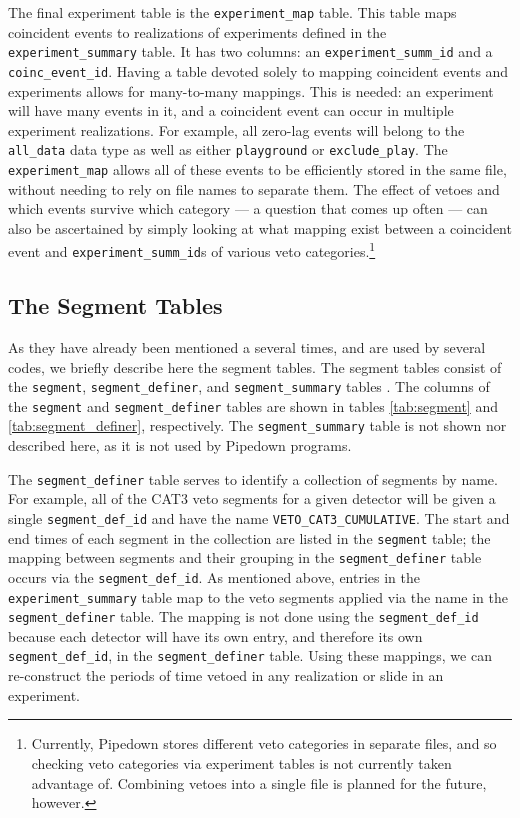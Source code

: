 The final experiment table is the \texttt{experiment\_map} table. This table maps coincident events to realizations of experiments defined in the \texttt{experiment\_summary} table. It has two columns: an \texttt{experiment\_summ\_id} and a \texttt{coinc\_event\_id}. Having a table devoted solely to mapping coincident events and experiments allows for many-to-many mappings. This is needed: an experiment will have many events in it, and a coincident event can occur in multiple experiment realizations. For example, all zero-lag events will belong to the \texttt{all\_data} data type as well as either \texttt{playground} or \texttt{exclude\_play}. The \texttt{experiment\_map} allows all of these events to be efficiently stored in the same file, without needing to rely on file names to separate them. The effect of vetoes and which events survive which category --- a question that comes up often --- can also be ascertained by simply looking at what mapping exist between a coincident event and \texttt{experiment\_summ\_id}s of various veto categories.\footnote{Currently, Pipedown stores different veto categories in separate files, and so checking veto categories via experiment tables is not currently taken advantage of. Combining vetoes into a single file is planned for the future, however.}

\subsection{The Segment Tables}
\label{sec:segment_tables}

As they have already been mentioned a several times, and are used by several codes, we briefly describe here the segment tables. The segment tables consist of the \texttt{segment}, \texttt{segment\_definer}, and \texttt{segment\_summary} tables \cite{BPP:segdb}. The columns of the \texttt{segment} and \texttt{segment\_definer} tables are shown in tables \ref{tab:segment} and \ref{tab:segment_definer}, respectively. The \texttt{segment\_summary} table is not shown nor described here, as it is not used by Pipedown programs.

The \texttt{segment\_definer} table serves to identify a collection of segments
by name. For example, all of the CAT3 veto segments for a given detector will
be given a single \texttt{segment\_def\_id} and have the name
\texttt{VETO\_CAT3\_CUMULATIVE}. The start and end times of each segment in the
collection are listed in the \texttt{segment} table; the mapping between
segments and their grouping in the \texttt{segment\_definer} table occurs via
the \texttt{segment\_def\_id}. As mentioned above, entries in the
\texttt{experiment\_summary} table map to the veto segments applied via the
name in the \texttt{segment\_definer} table. The mapping is not done using the
\texttt{segment\_def\_id} because each detector will have its own entry, and
therefore its own \texttt{segment\_def\_id}, in the \texttt{segment\_definer}
table. Using these mappings, we can re-construct the periods of time vetoed in
any realization or slide in an experiment.

